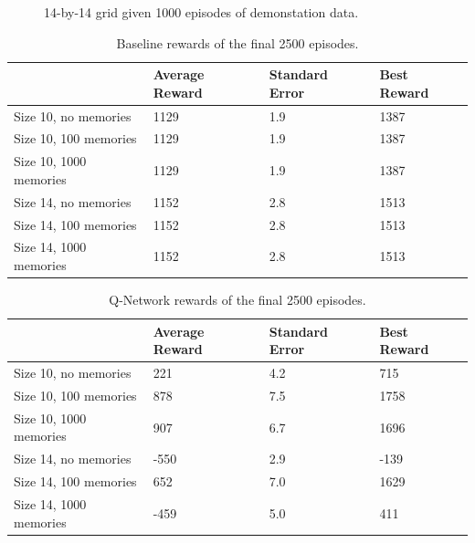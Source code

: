 \begin{figure}[H]
    \caption{14-by-14 grid given 1000 episodes of demonstation data.}
    \label{fig:14sized-1000mem}
\end{figure}


\begin{table}[H]
\begin{tabular}{l|l|l|l|}
\cline{2-4}
\textbf{} & Average Reward & Standard Error & Best Reward \\ \hline
\multicolumn{1}{|l|}{Size 10, no memories} & 1129 & 1.9 & 1387 \\ \hline
\multicolumn{1}{|l|}{Size 10, 100 memories} & 1129 & 1.9 & 1387 \\ \hline
\multicolumn{1}{|l|}{Size 10, 1000 memories} & 1129 & 1.9 & 1387 \\ \hline
\multicolumn{1}{|l|}{Size 14, no memories} & 1152 & 2.8 & 1513 \\ \hline
\multicolumn{1}{|l|}{Size 14, 100 memories} & 1152 & 2.8 & 1513 \\ \hline
\multicolumn{1}{|l|}{Size 14, 1000 memories} & 1152 & 2.8 & 1513 \\ \hline
\end{tabular}
\caption{Baseline rewards of the final 2500 episodes.}
\label{tab:2500base}
\end{table}
\begin{table}[H]
\begin{tabular}{l|l|l|l|}
\cline{2-4}
\textbf{} & Average Reward & Standard Error & Best Reward \\ \hline
\multicolumn{1}{|l|}{Size 10, no memories} & 221 & 4.2 & 715 \\ \hline
\multicolumn{1}{|l|}{Size 10, 100 memories} & 878 & 7.5 & 1758 \\ \hline
\multicolumn{1}{|l|}{Size 10, 1000 memories} & 907 & 6.7 & 1696 \\ \hline
\multicolumn{1}{|l|}{Size 14, no memories} & -550 & 2.9 & -139 \\ \hline
\multicolumn{1}{|l|}{Size 14, 100 memories} & 652 & 7.0 & 1629 \\ \hline
\multicolumn{1}{|l|}{Size 14, 1000 memories} & -459 & 5.0 & 411 \\ \hline
\end{tabular}
\caption{Q-Network rewards of the final 2500 episodes.}
\label{tab:2500qnet}
\end{table}
